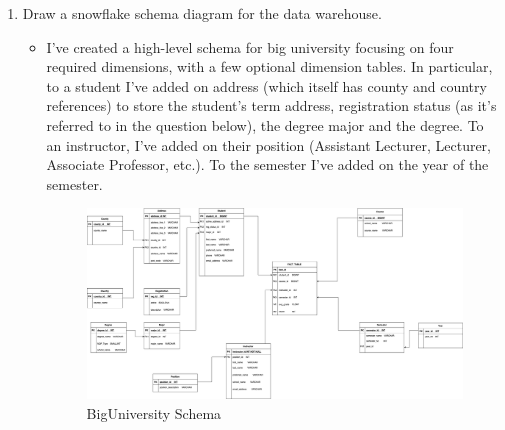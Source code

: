 \documentclass{scrreprt}
\begin{document}
\begin{enumerate}
	\item Draw a snowflake schema diagram for the data warehouse.
		\begin{itemize}
			\item  I've created a high-level schema for big university focusing on four required dimensions, with a few optional dimension tables. In particular, to a student I've added on address (which itself has county and country references) to store the student's term address, registration status (as it's referred to in the question below), the degree major and the degree. To an instructor, I've added on their position (Assistant Lecturer, Lecturer, Associate Professor, etc.). To the semester I've added on the year of the semester.
				\begin{figure}[h!]
				\centering
				\includegraphics[width=0.95\linewidth]{DataMining.drawio.png}
				\caption{BigUniversity Schema}\label{q3}
			\end{figure}
		\end{itemize}
	

\end{enumerate}
\end{document}
